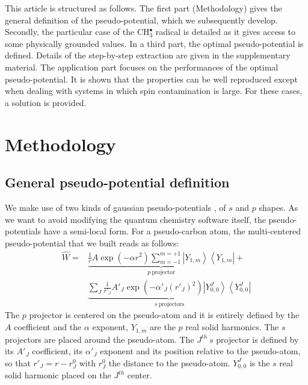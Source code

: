 \documentclass[aip]{revtex4-1}
\begin{document}
This article is structured as follows.
The first part (Methodology) gives the general definition of the pseudo-potential, which we subsequently develop.
Secondly, the particular case of the CH$_3^\bullet$ radical is detailed as it gives access
to some physically grounded values.
In a third part, the optimal pseudo-potential is defined. Details of the step-by-step extraction
are given in the supplementary material.
The application part focuses on the performances of the optimal pseudo-potential.
It is shown that the properties can be well reproduced except when dealing with
systems in which spin contamination is large.
For these cases, a solution is provided.

\section{Methodology}

\subsection{General pseudo-potential definition}

We make use of two kinds of gaussian pseudo-potentials \cite{me_structure_theory}, of \(s\) and \(p\) shapes. As we want to avoid modifying the quantum chemistry software itself, the pseudo-potentials have a semi-local form.
For a pseudo-carbon atom,
the multi-centered pseudo-potential that we built reads as follows:
\begin{align}
\label{eq:ourPP_init}
\hat{W} =&
\underbrace{\frac{1}{r} A\exp(-\alpha r^2)\sum_{m=-1}^{m=+1}\left|Y_{1,m}\right>\left<Y_{1,m}\right|}_{p \ \text{projector}}%
+\\
&\underbrace{\sum_J \frac{1}{r'_J} A'_J\exp(-\alpha'_J (r'_J)^2)\left|Y_{0,0}^J\right>\left<Y_{0,0}^J\right|}_{s \ \text{projectors}}%
\nonumber
\end{align}
The $p$ projector is centered on the pseudo-atom and it is entirely defined by the $A$ coefficient
and the $\alpha$ exponent, $Y_{1,m}$ are the $p$ real solid harmonics. The $s$ projectors are
placed around the pseudo-atom. The $J^{th} \ s$ projector is defined by its $A'_J$ coefficient, its
$\alpha'_J$ exponent and its position relative to the pseudo-atom, so that $r'_J = r-r^0_J$ with
$r^0_J$ the distance to the pseudo-atom. $Y_{0,0}^J$ is the $s$ real solid harmonic placed on
the $J^{th}$ center.
\end{document}
